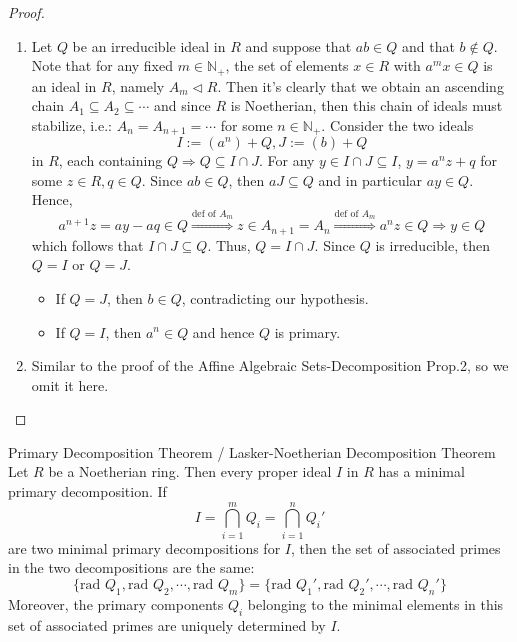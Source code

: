 \begin{proof}
    \begin{enumerate}
        \item Let $Q$ be an irreducible ideal in $R$ and suppose that $ab\in Q$ and that $b \notin Q$. Note that for any fixed $m\in \mathbb{
        N
        }_+$, the set of elements $x\in R$ with $a^mx \in Q$ is an ideal in $R$, namely $A_m \triangleleft R$. Then it's clearly that we obtain an ascending chain $A_1 \subseteq A_2 \subseteq \cdots$ and since $R$ is Noetherian, then this chain of ideals must stabilize, i.e.: $A_n =A_{n+1} =\cdots$ for some $n\in \mathbb{N}_+$. Consider the two ideals
        $$I:= (a^n)+Q,J:=(b)+Q$$
        in $R$, each containing $Q \Rightarrow Q \subseteq I \cap J$. For any $y \in I\cap J \subseteq I$, $y=a^nz+q$ for some $z\in R,q\in Q$. Since $ab \in Q$, then $aJ \subseteq Q$ and in particular $ay \in Q$. Hence,
        \[
        a^{n+1}z= ay-aq \in Q \overset{\text{def of }A_m}{\Rightarrow} z\in A_{n+1} =A_n \overset{\text{def of }A_m}{\Rightarrow} a^nz \in Q \Rightarrow y\in Q
        \]
        which follows that $I \cap J\subseteq Q$. Thus, $Q=I\cap J$. Since $Q$ is irreducible, then $Q=I$ or $Q=J$.
        \begin{itemize}
            \item If $Q=J$, then $b\in Q$, contradicting our hypothesis.
            \item If $Q=I$, then $a^n\in Q$ and hence $Q$ is primary.
        \end{itemize}

        \item Similar to the proof of the Affine Algebraic Sets-Decomposition Prop.2, so we omit it here.
    \end{enumerate}
\end{proof}

\begin{theorem}{Primary Decomposition Theorem / Lasker-Noetherian Decomposition Theorem}\\
Let $R$ be a Noetherian ring. Then every proper ideal $I$ in $R$ has a minimal primary decomposition. If 
$$I= \bigcap_{i=1}^m Q_i=\bigcap_{i=1}^nQ_i'$$
are two minimal primary decompositions for $I$, then the set of associated primes in the two decompositions are the same:
\[
\{ \text{rad }Q_1, \text{rad }Q_2 ,\cdots, \text{rad }Q_m\}= \{ \text{rad }Q_1' ,\text{rad }Q_2',\cdots, \text{rad }Q_n'\}
\]
Moreover, the primary components $Q_i$ belonging to the minimal elements in this set of associated primes are uniquely determined by $I$.
\end{theorem}

